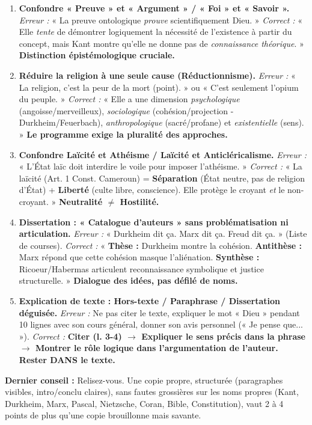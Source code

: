 \documentclass[11pt]{article}
\newcommand{\cle}[1]{{\popxbold\color{popdark}#1}}
\begin{document}
\begin{attention}
\begin{enumerate}
    \item \textbf{Confondre « Preuve » et « Argument » / « Foi » et « Savoir ».} \rightarrow \textit{Erreur :} « La preuve ontologique \emph{prouve} scientifiquement Dieu. » \textit{Correct :} « Elle \emph{tente} de démontrer logiquement la nécessité de l'existence à partir du concept, mais Kant montre qu'elle ne donne pas de \emph{connaissance théorique}. » \textbf{Distinction épistémologique cruciale.}
    \item \textbf{Réduire la religion à une seule cause (Réductionnisme).} \rightarrow \textit{Erreur :} « La religion, c'est la peur de la mort (point). » ou « C'est seulement l'opium du peuple. » \textit{Correct :} « Elle a une dimension \emph{psychologique} (angoisse/merveilleux), \emph{sociologique} (cohésion/projection - Durkheim/Feuerbach), \emph{anthropologique} (sacré/profane) et \emph{existentielle} (sens). » \textbf{Le programme exige la pluralité des approches.}
    \item \textbf{Confondre Laïcité et Athéisme / Laïcité et Anticléricalisme.} \rightarrow \textit{Erreur :} « L'État laïc doit interdire le voile pour imposer l'athéisme. » \textit{Correct :} « La laïcité (Art. 1 Const. Cameroun) = \textbf{Séparation} (État neutre, pas de religion d'État) + \textbf{Liberté} (culte libre, conscience). Elle protège le croyant \emph{et} le non-croyant. » \textbf{Neutralité $\neq$ Hostilité.}
    \item \textbf{Dissertation : « Catalogue d'auteurs » sans problématisation ni articulation.} \rightarrow \textit{Erreur :} « Durkheim dit ça. Marx dit ça. Freud dit ça. » (Liste de courses). \textit{Correct :} « \textbf{Thèse :} Durkheim montre la cohésion. \textbf{Antithèse :} Marx répond que cette cohésion masque l'aliénation. \textbf{Synthèse :} Ricoeur/Habermas articulent reconnaissance symbolique et justice structurelle. » \textbf{Dialogue des idées, pas défilé de noms.}
    \item \textbf{Explication de texte : Hors-texte / Paraphrase / Dissertation déguisée.} \rightarrow \textit{Erreur :} Ne pas citer le texte, expliquer le mot « Dieu » pendant 10 lignes avec son cours général, donner son avis personnel (« Je pense que... »). \textit{Correct :} \textbf{Citer (l. 3-4) $\rightarrow$ Expliquer le sens précis dans la phrase $\rightarrow$ Montrer le rôle logique dans l'argumentation de l'auteur.} \textbf{Rester DANS le texte.}
\end{enumerate}
\textbf{Dernier conseil :} \cle{Relisez-vous.} Une copie propre, structurée (paragraphes visibles, intro/conclu claires), sans fautes grossières sur les noms propres (Kant, Durkheim, Marx, Pascal, Nietzsche, Coran, Bible, Constitution), vaut 2 à 4 points de plus qu'une copie brouillonne mais savante.
\end{attention}
\end{document}
